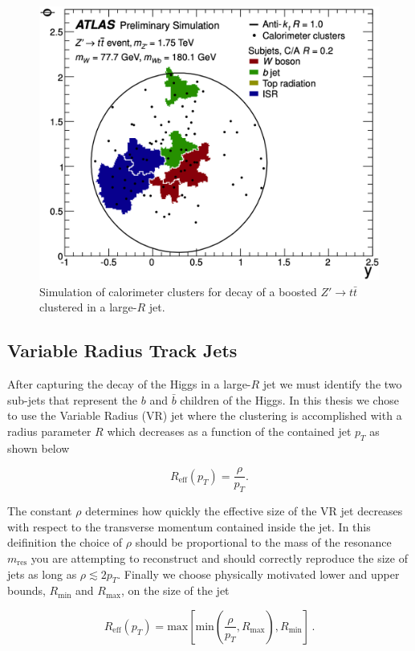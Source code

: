 \begin{figure}[!htbp]
  \centering
  \includegraphics[width=0.7\linewidth]{figures/objects/large_R_example}
  \caption{\cite{ATLAS-CONF-2014-003} Simulation of calorimeter clusters for decay of a boosted $Z' \rightarrow t\bar{t}$ clustered in a large-$R$ jet.}
  \label{sec:object:large_R_example}
\end{figure}

\subsection{Variable Radius Track Jets} \label {sec:objects:vrjets}

After capturing the decay of the Higgs in a large-$R$ jet we must identify the
two sub-jets that represent the $b$ and $\bar{b}$ children of the Higgs. In
this thesis we chose to use the Variable Radius (VR) jet
\cite{Krohn:2009zg,ATL-PHYS-PUB-2017-010} where the clustering is accomplished
with a radius parameter $R$ which decreases as a function of the contained jet
$p_{T}$ as shown below

\[ R_{\text{eff}}(p_{T}) = \frac{\rho}{p_{T}}. \]

The constant $\rho$ determines how quickly the effective size of the VR jet
decreases with respect to the transverse momentum contained inside the jet.  In
this deifinition the choice of $\rho$ should be proportional to the mass of the
resonance $m_{\text{res}}$ you are attempting to reconstruct and should
correctly reproduce the size of jets as long as $\rho \lesssim 2p_{T}$.
Finally we choose physically motivated lower and upper bounds, $R_{\text{min}}$ and
$R_{\text{max}}$, on the size of the jet

\[
 R_{\text{eff}} \left(p_{T}\right)= \text{max}\left[\text{min}\left(\frac{\rho}{p_{T}},R_{\text{max}}\right),R_{\text{min}}\right]\,.
\]

